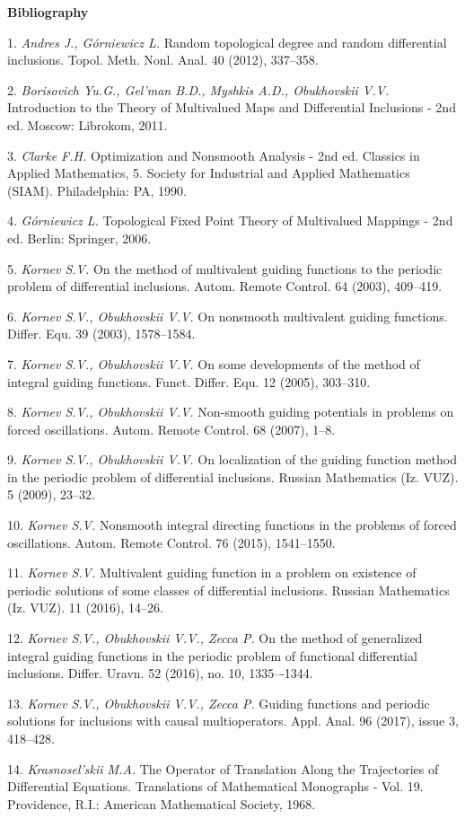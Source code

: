 \smallskip \centerline {\bf Bibliography} \nopagebreak

1. {\it Andres J., G\'orniewicz L.} Random topological degree and random differential inclusions. Topol. Meth. Nonl. Anal. 40 (2012), 337--358.

2. {\it Borisovich Yu.G., Gel'man B.D., Myshkis A.D., Obukho\-vskii V.V.} Introduction to the Theory of Multivalued Maps and Dif\-fe\-ren\-tial Inclusions - 2nd ed. Moscow: Librokom, 2011.

3. {\it Clarke F.H.} Optimization and Nonsmooth Analysis - 2nd ed. Classics in Applied Mathematics, 5. Society for Industrial and Applied Mathematics (SIAM). Philadelphia: PA, 1990.

4. {\it G\'orniewicz L.} Topological Fixed Point Theory of Multi\-valued Mappings - 2nd ed. Berlin: Springer, 2006.

5. {\it Kornev S.V.} On the method of multivalent guiding functi\-ons to the periodic problem of differential inclusions. Autom. Re\-mote Control. 64 (2003), 409--419.

6. {\it Kornev S.V., Obukhovskii V.V.} On nonsmooth multiva\-lent guiding functions. Differ. Equ. 39 (2003), 1578--1584.

7. {\it Kornev S.V., Obukhovskii V.V.} On some developments of the method of integral guiding functions. Funct. Differ. Equ. 12 (2005), 303--310.

8. {\it Kornev S.V., Obukhovskii V.V.} Non-smooth guiding po\-tentials in problems on forced oscillations. Autom. Remote Con\-trol. 68 (2007), 1--8.

9. {\it Kornev S.V., Obukhovskii V.V.} On localization of the guiding function method in the periodic problem of differential inclusions. Russian Mathematics (Iz. VUZ). 5 (2009), 23--32.

10. {\it Kornev S.V.} Nonsmooth integral directing functions in the problems of forced oscillations. Autom. Remote Control. 76 (2015), 1541--1550.

11. {\it Kornev S.V.} Multivalent guiding function in a problem on existence of periodic solutions of some classes of differential inclusions. Russian Mathematics (Iz. VUZ). 11 (2016), 14--26.

12. {\it Kornev S.V., Obukhovskii V.V., Zecca P.} On the method of generalized integral guiding functions in the periodic problem of functional differential inclusions. Differ. Uravn. 52 (2016), no. 10, 1335–-1344.

13. {\it Kornev S.V., Obukhovskii V.V., Zecca P.} Guiding func\-ti\-ons and periodic solutions for inclusions with causal multiope\-rators. Appl. Anal. 96 (2017), issue 3, 418--428.

14. {\it Krasnosel'skii M.A.} The Operator of Translation Along the Trajectories of Differential Equations. Translations of Ma\-the\-ma\-tical Monographs - Vol. 19. Providence, R.I.: American Ma\-the\-matical Society, 1968.
